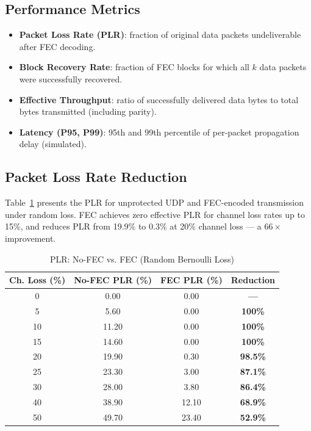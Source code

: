 \documentclass[conference]{IEEEtran}
\begin{document}
\subsection{Performance Metrics}

\begin{itemize}
  \item \textbf{Packet Loss Rate (PLR)}: fraction of original data
        packets undeliverable after FEC decoding.
  \item \textbf{Block Recovery Rate}: fraction of FEC blocks for which
        all $k$ data packets were successfully recovered.
  \item \textbf{Effective Throughput}: ratio of successfully delivered
        data bytes to total bytes transmitted (including parity).
  \item \textbf{Latency (P95, P99)}: 95th and 99th percentile of
        per-packet propagation delay (simulated).
\end{itemize}

\subsection{Packet Loss Rate Reduction}

Table~\ref{tab:plr} presents the PLR for unprotected UDP and FEC-encoded
transmission under random loss. FEC achieves zero effective PLR for
channel loss rates up to 15\%, and reduces PLR from 19.9\% to 0.3\% at
20\% channel loss --- a $66\times$ improvement.

\begin{table}[!t]
\renewcommand{\arraystretch}{1.25}
\caption{PLR: No-FEC vs. FEC (Random Bernoulli Loss)}
\label{tab:plr}
\centering
\small
\begin{tabular}{ccc>{\bfseries}c}
\toprule
\textbf{Ch. Loss (\%)} & \textbf{No-FEC PLR (\%)} &
  \textbf{FEC PLR (\%)} & \textbf{Reduction} \\
\midrule
 0  & 0.00  & 0.00  & ---       \\
 5  & 5.60  & 0.00  & 100\%     \\
10  & 11.20 & 0.00  & 100\%     \\
15  & 14.60 & 0.00  & 100\%     \\
20  & 19.90 & 0.30  & 98.5\%    \\
25  & 23.30 & 3.00  & 87.1\%    \\
30  & 28.00 & 3.80  & 86.4\%    \\
40  & 38.90 & 12.10 & 68.9\%    \\
50  & 49.70 & 23.40 & 52.9\%    \\
\bottomrule
\end{tabular}
\end{table}
\end{document}
